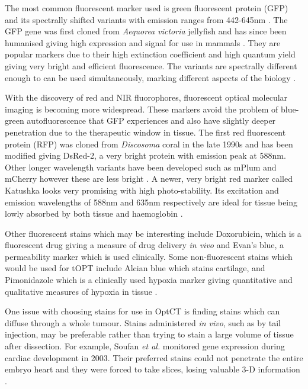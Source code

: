 \documentclass[12pt]{article}
\begin{document}
The most common fluorescent marker used is  green fluorescent protein (GFP) and its spectrally shifted variants with emission ranges from 442-645nm \cite{Hoffman:2005}. The GFP gene was first cloned from \textit{Aequorea victoria} jellyfish and has since been humanised giving high expression and signal for use in mammals \cite{Hoffman:2009}. They are popular markers due to their high extinction coefficient and high quantum yield giving very bright and efficient fluorescence. The variants are spectrally different enough to can be used simultaneously, marking different aspects of the biology \cite{Hoffman:2005}. 

With the discovery of red and NIR fluorophores, fluorescent optical molecular imaging is becoming  more widespread. These markers avoid the problem of blue-green autofluorescence that GFP experiences and also have slightly deeper penetration due to the therapeutic window in tissue. The first red fluorescent protein (RFP) was cloned from \textit{Discosoma} coral in the late 1990s and has been modified giving DsRed-2, a very bright protein with emission peak at 588nm. Other longer wavelength variants have been developed such as mPlum and mCherry however these are less bright \cite{Hoffman:2009}. A newer, very bright red marker called Katushka looks very promising with high photo-stability. Its excitation and emission wavelengths of 588nm and 635nm respectively are ideal for tissue being lowly absorbed by both tissue and haemoglobin \cite{Shcherbo:2007}.
 

Other fluorescent stains which may be interesting include  Doxorubicin, which is a fluorescent drug  giving a measure of drug delivery \textit{in vivo} and Evan's blue, a permeability marker which is used clinically. 
Some non-fluorescent stains which would be used for tOPT include Alcian blue which stains cartilage, and Pimonidazole which is a clinically used hypoxia marker giving quantitative and qualitative measures of hypoxia in tissue \cite{Varia:1998}. 



One issue with choosing stains for use in OptCT is finding stains which can diffuse through a whole tumour. Stains administered \textit{in vivo}, such as by tail injection, may be preferable rather than trying to stain a large volume of tissue after dissection. For example, Soufan \textit{et al.} monitored gene expression during cardiac development in 2003. Their preferred stains  could not penetrate the entire embryo heart and they were forced to take slices, losing valuable 3-D information \cite{Soufan:2003cd}. 
\end{document}
